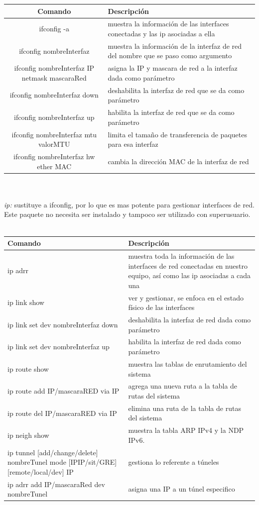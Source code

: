 \documentclass[10pt,a4paper,titlepage]{article}
\begin{document}
	\begin{tabular}{|c|p{7cm}|}
		\hline
		Comando & Descripción \\
		\hline
		ifconfig -a & muestra la información de las interfaces conectadas y las ip asociadas a ella \\
		\hline
		ifconfig nombreInterfaz & muestra la información de la interfaz de red del nombre que se paso como argumento \\
		\hline
		ifconfig nombreInterfaz IP netmask mascaraRed & asigna la IP y mascara de red a la interfaz dada como parámetro \\
		\hline
		ifconfig nombreInterfaz down & deshabilita la interfaz de red que se da como parámetro \\
		\hline
		ifconfig nombreInterfaz up & habilita la interfaz de red que se da como parámetro \\
		\hline
		ifconfig nombreInterfaz mtu valorMTU & limita el tamaño de transferencia de paquetes para esa interfaz \\
		\hline
		ifconfig nombreInterfaz hw ether MAC & cambia la dirección MAC de la interfaz de red \\
		\hline
	\end{tabular}
	\\
	\\
	\emph{ip:} sustituye a ifconfig, por lo que es mas potente para gestionar interfaces de red. Este paquete no necesita ser instalado y tampoco ser utilizado con superusuario.
	\\
	\\
	\begin{tabular}{|p{8cm}|p{7cm}|}
		\hline
		Comando & Descripción \\
		\hline
		ip adrr & muestra toda la información de las interfaces de red conectadas en nuestro equipo, así como las ip asociadas a cada una \\
		\hline
		ip link show & ver y gestionar, se enfoca en el estado físico de las interfaces \\
		\hline
		ip link set dev nombreInterfaz down & deshabilita la interfaz de red dada como parámetro \\
		\hline
		ip link set dev nombreInterfaz up & habilita la interfaz de red dada como parámetro \\
		\hline
		ip route show & muestra las tablas de enrutamiento del sistema \\
		\hline
		ip route add IP/mascaraRED via IP & agrega una nueva ruta a la tabla de rutas del sistema \\
		\hline
		ip route del IP/mascaraRED via IP & elimina una ruta de la tabla de rutas del sistema \\
		\hline
		ip neigh show & muestra la tabla ARP IPv4 y la NDP IPv6. \\
		\hline
		ip tunnel [add/change/delete] nombreTunel mode [IPIP/sit/GRE] [remote/local/dev] IP & gestiona lo referente a túneles \\ 
		\hline
		ip adrr add IP/mascaraRed dev nombreTunel & asigna una IP a un túnel especifico \\
		\hline
	\end{tabular}
\end{document}
